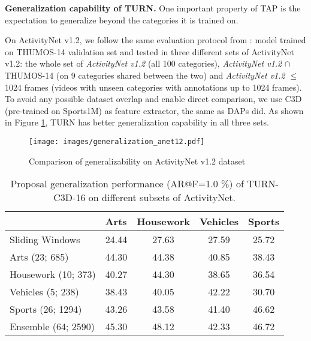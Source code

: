 \documentclass[10pt,twocolumn,letterpaper]{article}
\begin{document}
\textbf{Generalization capability of TURN.}
One important property of TAP is the expectation to generalize beyond the categories it is trained on. 

On ActivityNet v1.2, we follow the same evaluation protocol from \cite{escorcia2016daps}: model trained on THUMOS-14 validation set and tested in three different sets of ActivityNet v1.2: the whole set of \textit{ActivityNet v1.2} (all 100 categories), \textit{ActivityNet v1.2} $\cap$ THUMOS-14 (on 9 categories shared between the two) and \textit{ActivityNet v1.2} $\leqslant$ 1024 frames (videos with unseen categories with annotations up to 1024 frames). To avoid any possible dataset overlap and enable direct comparison, we use C3D (pre-trained on Sports1M) as feature extractor, the same as DAPs did. As shown in Figure \ref{fig:generalization}, TURN has better generalization capability in all three sets.
\begin{figure}[]

  \centering
    \texttt{[image: images/generalization\_anet12.pdf]}
    \caption{Comparison of generalizability on ActivityNet v1.2 dataset}
      \label{fig:generalization}
\end{figure}



\begin{table}[h]\footnotesize
\centering
\caption{Proposal generalization performance (AR@F=1.0 \%) of TURN-C3D-16 on different subsets of ActivityNet.}
\label{tbl:generalization}
\begin{tabular}{l|cccc}
\hline
\multicolumn{1}{l|}{} & \multicolumn{1}{l}{Arts} & \multicolumn{1}{l}{Housework} & \multicolumn{1}{l}{Vehicles} & Sports \\ \hline
Sliding Windows   &24.44    &27.63    &27.59    &25.72 \\ \hline
Arts (23; 685)                  & 44.30                    & 44.38                         & 40.85                         & 38.43  \\
Housework (10; 373)             & 40.27                    & 44.30                         & 38.65                        & 36.54  \\
Vehicles (5; 238)              & 38.43                    & 40.05                         & 42.22                        & 30.70  \\
Sports (26; 1294)                & 43.26                    & 43.58                         & 41.40                        & 46.62  \\ 
Ensemble (64; 2590)        &45.30      &48.12     &42.33      &46.72 \\ \hline 
\end{tabular}
\end{table}
\end{document}
